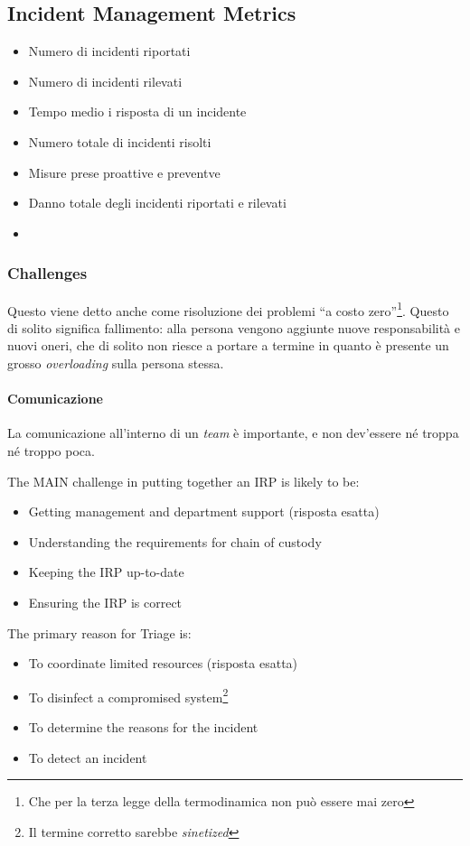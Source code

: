 \subsection{Incident Management Metrics}
\begin{itemize}
\item Numero di incidenti riportati
\item Numero di incidenti rilevati
\item Tempo medio i risposta di un incidente
\item Numero totale di incidenti risolti 
\item Misure prese proattive e preventve
\item Danno totale degli incidenti riportati e rilevati
\item {}
\end{itemize}

\subsubsection{Challenges} %

Questo viene detto anche come risoluzione dei problemi ``a costo 
zero''\footnote{Che per la terza legge della termodinamica non può essere mai 
zero}. Questo di solito significa fallimento: alla persona vengono aggiunte 
nuove responsabilità e nuovi oneri, che di solito non riesce a portare a termine 
in quanto è presente un grosso \textit{overloading} sulla persona stessa.

\paragraph*{Comunicazione} La comunicazione all'interno di un \textit{team} è 
importante, e non dev'essere né troppa né troppo poca.

The MAIN challenge in putting together an IRP is likely to be:
\begin{itemize}
\item Getting management and department support (risposta esatta)
\item Understanding the requirements for chain of custody
\item Keeping the IRP up-to-date
\item Ensuring the IRP is correct
\end{itemize}

The primary reason for Triage is:
\begin{itemize}
\item To coordinate limited resources (risposta esatta)
\item To disinfect a compromised system\footnote{Il termine corretto sarebbe 
\textit{sinetized}} %
\item To determine the reasons for the incident
\item To detect an incident
\end{itemize}



